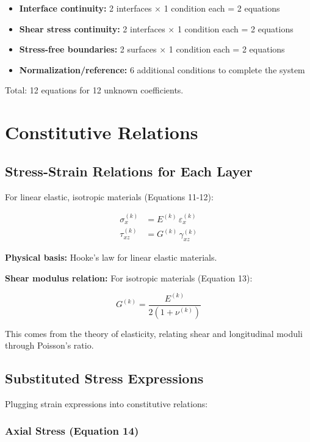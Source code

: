 \documentclass[12pt,a4paper]{article}
\begin{document}
\begin{itemize}
\item \textbf{Interface continuity:} 2 interfaces × 1 condition each = 2 equations
\item \textbf{Shear stress continuity:} 2 interfaces × 1 condition each = 2 equations
\item \textbf{Stress-free boundaries:} 2 surfaces × 1 condition each = 2 equations
\item \textbf{Normalization/reference:} 6 additional conditions to complete the system
\end{itemize}

Total: 12 equations for 12 unknown coefficients.

\section{Constitutive Relations}

\subsection{Stress-Strain Relations for Each Layer}

For linear elastic, isotropic materials (Equations 11-12):

\begin{align}
\sigma_x^{(k)} &= E^{(k)} \, \varepsilon_x^{(k)} \\
\tau_{xz}^{(k)} &= G^{(k)} \, \gamma_{xz}^{(k)}
\end{align}

\textbf{Physical basis:} Hooke's law for linear elastic materials.

\textbf{Shear modulus relation:} For isotropic materials (Equation 13):

\begin{equation}
G^{(k)} = \frac{E^{(k)}}{2 \left( 1 + \nu^{(k)} \right)}
\end{equation}

This comes from the theory of elasticity, relating shear and longitudinal moduli through Poisson's ratio.

\subsection{Substituted Stress Expressions}

Plugging strain expressions into constitutive relations:

\subsubsection{Axial Stress (Equation 14)}
\end{document}
